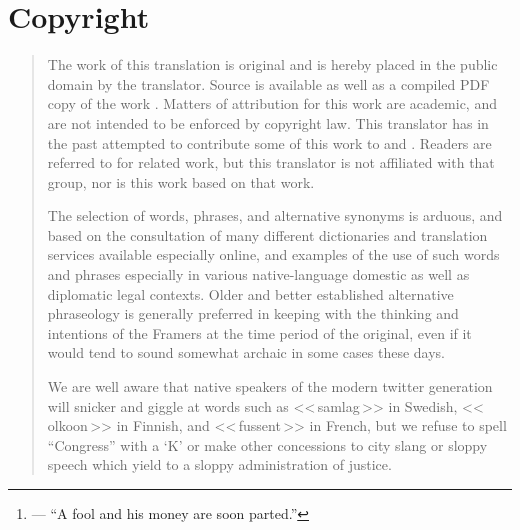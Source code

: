 \documentclass[a4paper,landscape,10pt]{article}
\begin{document}
\begin{abstract}
	French has a future tense integral with the conjugation of the verb. We cannot do better to translate the word ``jeopardy'' than to simply sound out the word in French: \foreignlanguage{french}{<<\,jeu-parti,\,>>} that is, a game (\foreignlanguage{french}{<<\,jeu\,>>}) of chance, where something of great value is at stake \foreignlanguage{french}{<<\,[à être] parti,\,>>} that is, ``[to be] parted,'' as the fool and his money of the common proverb;\footnote{--- ``A fool and his money are soon parted.''} and here we speak of life and limb.  Cf{.} \cite{wp-bor-fr,jpfo-bor-fr}.
	
	A fourth translation, to the Spanish language, is contemplated, and would be desirable, as it would have great relevance within the United States for a large number of Spanish-speaking citizens, but this translator is not at this time sufficiently skilled in that language to attempt it right-off. In the meantime Spanish-speaking readers are referred, rather cynically, to others' work \cite{jpfo-bor-es,wp-bor-es} in that regard. We cannot say that we are impressed with the title and authorship of that particular work, let alone the quality of the work itself, which we are not in a position to judge.
\end{abstract}

\section*{Copyright}

\begin{quote}
The work of this translation is original and is hereby placed in the public domain by the translator. Source \cite{src} is available as well as a compiled PDF copy of the work \cite{doc}. Matters of attribution for this work are academic, and are not intended to be enforced by copyright law. This translator has in the past attempted to contribute some of this work to \cite{wp-bor-sv} and \cite{wp-bor-fi}. Readers are referred to \cite{jpfo-bor} for related work, but this translator is not affiliated with that group, nor is this work based on that work.

	The selection of words, phrases, and alternative synonyms is arduous, and based on the consultation of many different dictionaries and translation services available especially online, and examples of the use of such words and phrases especially in various native-language domestic as well as diplomatic legal contexts. Older and better established alternative phraseology is generally preferred in keeping with the thinking and intentions of the Framers at the time period of the original, even if it would tend to sound somewhat archaic in some cases these days.

	We are well aware that native speakers of the modern twitter generation will snicker and giggle at words such as \foreignlanguage{swedish}{<<\,samlag\,>>} in Swedish, \foreignlanguage{finnish}{<<\,olkoon\,>>} in Finnish, and \foreignlanguage{french}{<<\,fussent\,>>} in French, but we refuse to spell ``Congress'' with a `K' or make other concessions to city slang or sloppy speech which yield to a sloppy administration of justice.
\end{quote}
\end{document}
